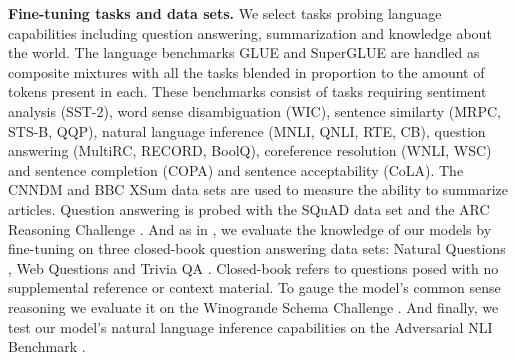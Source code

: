 \documentclass[twoside,11pt]{article}
\begin{document}
\textbf{Fine-tuning tasks and data sets.} We select tasks probing language capabilities including question answering, summarization and knowledge about the world.
The language benchmarks GLUE \citep{wang2018glue} and SuperGLUE \citep{wang2019superglue} are handled as composite mixtures with all the tasks blended in proportion to the amount of tokens present in each.
These benchmarks consist of tasks requiring sentiment analysis (SST-2), word sense disambiguation (WIC), sentence similarty (MRPC, STS-B, QQP), natural language inference (MNLI, QNLI, RTE, CB), question answering (MultiRC, RECORD, BoolQ), coreference resolution (WNLI, WSC) and sentence completion (COPA) and sentence acceptability (CoLA).
The CNNDM \citep{cnn2015moritz} and BBC XSum \citep{narayan2018don} data sets are used to measure the ability to summarize articles.
Question answering is probed with the SQuAD data set \citep{rajpurkar2016squad} and the ARC Reasoning Challenge \citep{clark2018think}.
And as in \cite{roberts2020much}, we evaluate the knowledge of our models by fine-tuning on three closed-book question answering data sets:  Natural Questions \citep{kwiatkowski2019natural}, Web Questions \citep{berant2013semantic} and Trivia QA \citep{joshi2017triviaqa}. 
Closed-book refers to questions posed with no supplemental reference or context material. 
To gauge the model's common sense reasoning we evaluate it on the Winogrande Schema Challenge \citep{sakaguchi2020winogrande}.
And finally, we test our model's natural language inference capabilities on the Adversarial NLI Benchmark \citep{nie2019adversarial}.
\end{document}
